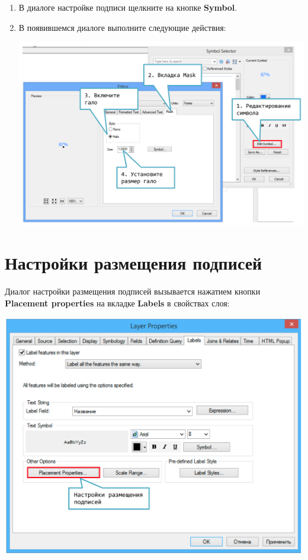 \documentclass[12pt,]{book}
\begin{document}
\begin{enumerate}
\def\labelenumi{\arabic{enumi}.}
\item
  В диалоге настройке подписи щелкните на кнопке \textbf{Symbol}.
\item
  В появившемся диалоге выполните следующие действия:

  \includegraphics{images/Appendix/image42.png}
\end{enumerate}

\hypertarget{section-27}{%
\section{Настройки размещения подписей}\label{section-27}}

Диалог настройки размещения подписей вызывается нажатием кнопки \textbf{Placement properties} на вкладке \textbf{Labels} в свойствах слоя:

\includegraphics{images/Appendix/image43.png}
\end{document}
